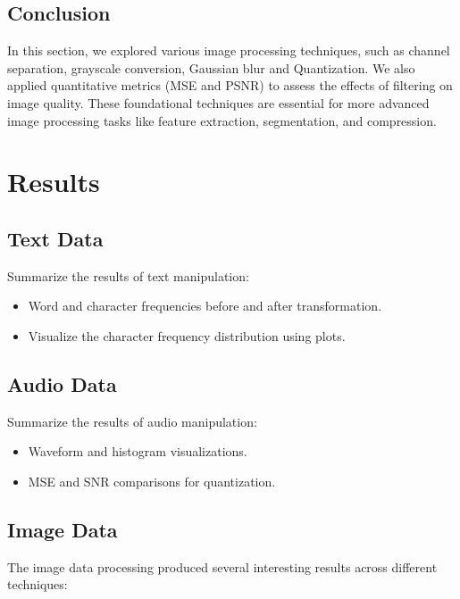 \documentclass[a4paper,12pt]{article}
\begin{document}
\subsection{Conclusion}
In this section, we explored various image processing techniques, such as channel separation, grayscale conversion, Gaussian blur and Quantization. We also applied quantitative metrics (MSE and PSNR) to assess the effects of filtering on image quality. These foundational techniques are essential for more advanced image processing tasks like feature extraction, segmentation, and compression.



\section{Results}
\subsection{Text Data}
Summarize the results of text manipulation:
\begin{itemize}
    \item Word and character frequencies before and after transformation.
    \item Visualize the character frequency distribution using plots.
\end{itemize}

\subsection{Audio Data}
Summarize the results of audio manipulation:
\begin{itemize}
    \item Waveform and histogram visualizations.
    \item MSE and SNR comparisons for quantization.
\end{itemize}

\subsection{Image Data}
The image data processing produced several interesting results across different techniques:
\end{document}

